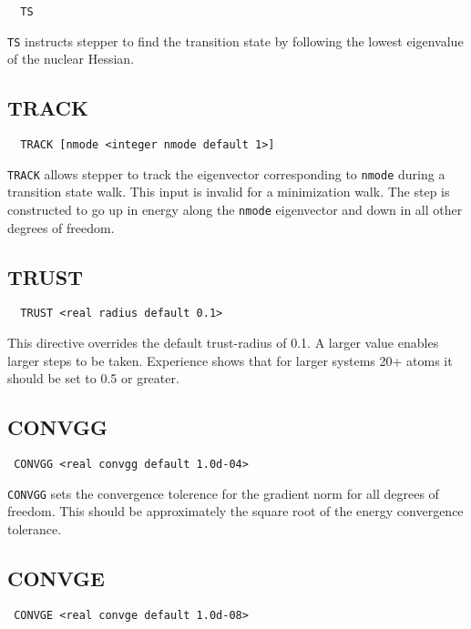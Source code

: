 \begin{verbatim}
  TS
\end{verbatim}

\verb+TS+ instructs stepper to find the transition state by following the
lowest eigenvalue of the nuclear Hessian.

\subsection{TRACK}

\begin{verbatim}
  TRACK [nmode <integer nmode default 1>]
\end{verbatim}

\verb+TRACK+ allows stepper to track the eigenvector corresponding to
\verb+nmode+ during a transition state walk.  This input is invalid
for a minimization walk.  The step is constructed to go up in energy
along the \verb+nmode+ eigenvector and down in all other degrees of
freedom.  

\subsection{TRUST}

\begin{verbatim}
  TRUST <real radius default 0.1>
\end{verbatim}

  This directive overrides the default trust-radius of 0.1.  A larger
value enables larger steps to be taken. Experience shows that for
larger systems 20+ atoms it should be set to 0.5 or greater.

\subsection{CONVGG}
\begin{verbatim}
 CONVGG <real convgg default 1.0d-04>
\end{verbatim}

\verb+CONVGG+ sets the convergence tolerence for the gradient norm for
all degrees of freedom.  This should be approximately the square root
of the energy convergence tolerance.  

\subsection{CONVGE}
\begin{verbatim}
 CONVGE <real convge default 1.0d-08>
\end{verbatim}

